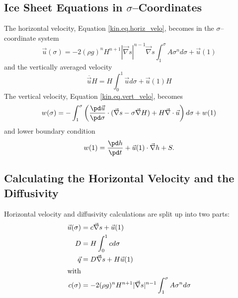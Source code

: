 \subsection{Ice Sheet Equations in $\sigma$--Coordinates}
The horizontal velocity, Equation \eqref{kin.eq.horiz_velo}, becomes in the $\sigma$--coordinate system
\begin{equation}
  \label{kin.eq.vert_velo_sigma}
  \vec u(\sigma) = -2(\rho g)^nH^{n+1}|\vec\nabla s|^{n-1}\vec\nabla s\int_1^\sigma A\sigma^nd\sigma+\vec u(1)
\end{equation}
and the vertically averaged velocity
\begin{equation}
  \label{kin.eq.avg_velo_scaled}
  \overline{\vec u} H=H\int_0^1\vec ud\sigma+\vec u(1)H
\end{equation}
The vertical velocity, Equation \eqref{kin.eq.vert_velo}, becomes
\begin{equation}
  \label{kin.eq.vert_velo_scaled}
  w(\sigma)=-\int_1^\sigma\left(\frac{\pd\vec u}{\pd\sigma}\cdot(\vec\nabla s-\sigma\vec\nabla H)+H\vec\nabla\cdot\vec u\right)d\sigma+w(1)
\end{equation}
and lower boundary condition
\begin{equation}
  w(1)=\frac{\pd h}{\pd t}+\vec u(1)\cdot\vec\nabla h+S.
\end{equation}

\subsection{Calculating the Horizontal Velocity and the Diffusivity}
Horizontal velocity and diffusivity calculations are split up into two parts:
\begin{subequations}
  \label{kin.eq.horiz_diffusivity}
  \begin{align}
    \vec u(\sigma)&=c\vec\nabla s+\vec u(1)\\
    D &=H\int_0^1cd\sigma\\
    \vec q&=D\vec\nabla s+H\vec u(1)\\
    \intertext{with}
    c(\sigma)&=-2(\rho g)^nH^{n+1}|\vec\nabla s|^{n-1}\int_1^\sigma A\sigma^nd\sigma
  \end{align}
\end{subequations}


